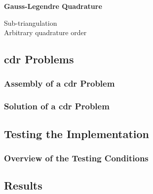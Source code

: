 \begin{frame}
    \begin{center}
        {\color{\accentcolor} \Large \textbf{Gauss-Legendre Quadrature}}
    \end{center}

    \begin{center}
        \begin{minipage}{0.75\textwidth}
            \begin{description}
                \item[Sub-triangulation] 
                \item[Arbitrary quadrature order] 
            \end{description}
        \end{minipage}
    \end{center}
    \vspace*{\fill}
    
\end{frame}

\subsection{\texorpdfstring{\acrshort{cdr}}{} Problems}

\begin{frame}
    \frametitle{Assembly of a \acrshort{cdr} Problem}

    
\end{frame}

\begin{frame}
    \frametitle{Solution of a \acrshort{cdr} Problem}

    
\end{frame}

\subsection{Testing the Implementation}

\begin{frame}
    \frametitle{Overview of the Testing Conditions}

    
\end{frame}

\subsection{Results}

